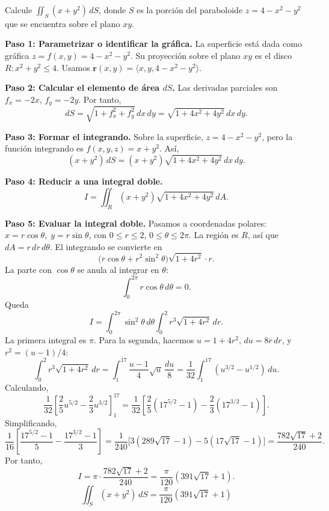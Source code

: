 \begin{example}
Calcule $\displaystyle \iint_S (x+y^2)\,dS$, donde $S$ es la porción del paraboloide $z=4-x^2-y^2$ que se encuentra sobre el plano $xy$.
\begin{myproof}
\textbf{Paso 1: Parametrizar o identificar la gráfica.}
La superficie está dada como gráfica $z=f(x,y)=4-x^2-y^2$. Su proyección sobre el plano $xy$ es el disco $R: x^2+y^2 \le 4$. Usamos $\mathbf{r}(x,y)=\langle x,y,4-x^2-y^2\rangle$.

\textbf{Paso 2: Calcular el elemento de área $dS$.}
Las derivadas parciales son $f_x=-2x$, $f_y=-2y$. Por tanto,
\[
dS = \sqrt{1+f_x^2+f_y^2}\,dx\,dy
= \sqrt{1+4x^2+4y^2}\,dx\,dy.
\]

\textbf{Paso 3: Formar el integrando.}
Sobre la superficie, $z=4-x^2-y^2$, pero la función integrando es $f(x,y,z)=x+y^2$. Así,
\[
(x+y^2)\,dS = (x+y^2)\sqrt{1+4x^2+4y^2}\,dx\,dy.
\]

\textbf{Paso 4: Reducir a una integral doble.}
\[
I = \iint_R (x+y^2)\sqrt{1+4x^2+4y^2}\,dA.
\]

\textbf{Paso 5: Evaluar la integral doble.}
Pasamos a coordenadas polares: $x=r\cos\theta,\; y=r\sin\theta$, con $0\le r\le 2$, $0\le\theta\le 2\pi$. La región es $R$, así que $dA = r\,dr\,d\theta$. El integrando se convierte en
\[
\bigl(r\cos\theta + r^2\sin^2\theta\bigr)\sqrt{1+4r^2}\cdot r.
\]
La parte con $\cos\theta$ se anula al integrar en $\theta$:
\[
\int_0^{2\pi} r\cos\theta \, d\theta = 0.
\]
Queda
\[
I = \int_0^{2\pi}\sin^2\theta\,d\theta \int_0^2 r^3\sqrt{1+4r^2}\,dr.
\]
La primera integral es $\pi$. Para la segunda, hacemos $u=1+4r^2$, $du=8r\,dr$, y $r^2=(u-1)/4$:
\[
\int_0^2 r^3\sqrt{1+4r^2}\,dr
= \int_1^{17} \frac{u-1}{4}\sqrt{u}\,\frac{du}{8}
= \frac{1}{32}\int_1^{17} (u^{3/2}-u^{1/2})\,du.
\]
Calculando,
\[
\frac{1}{32}\left[\frac{2}{5}u^{5/2}-\frac{2}{3}u^{3/2}\right]_1^{17}
= \frac{1}{32}\left[\frac{2}{5}(17^{5/2}-1)-\frac{2}{3}(17^{3/2}-1)\right].
\]
Simplificando,
\[
\frac{1}{16}\left[\frac{17^{5/2}-1}{5}-\frac{17^{3/2}-1}{3}\right]
= \frac{1}{240}\bigl[3(289\sqrt{17}-1)-5(17\sqrt{17}-1)\bigr]
= \frac{782\sqrt{17}+2}{240}.
\]
Por tanto,
\[
I = \pi \cdot \frac{782\sqrt{17}+2}{240}
= \frac{\pi}{120}(391\sqrt{17}+1).
\]
\[
\boxed{\displaystyle \iint_S (x+y^2)\,dS = \frac{\pi}{120}(391\sqrt{17}+1)}
\]
\end{myproof}
\end{example}

